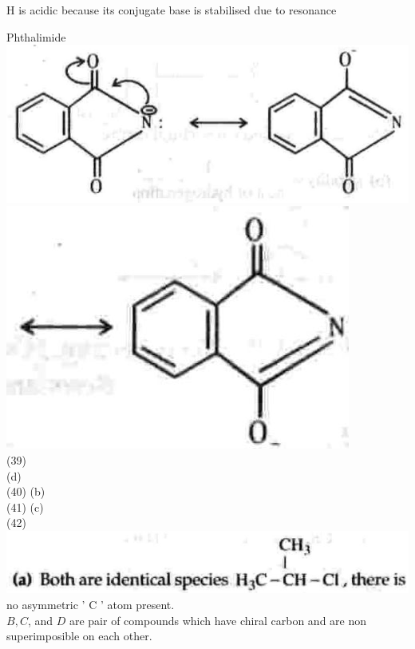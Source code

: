 \documentclass[10pt]{article}
\begin{document}
H is acidic because its conjugate base is stabilised due to resonance

Phthalimide\\
\includegraphics[max width=\textwidth, center]{2025_01_28_8470952b98110cec3aabg-165}\\
\includegraphics[max width=\textwidth, center]{2025_01_28_8470952b98110cec3aabg-165(5)}\\
(39)\\
(d)\\
(40) (b)\\
(41) (c)\\
(42)\\
\includegraphics[max width=\textwidth]{2025_01_28_8470952b98110cec3aabg-165(2)} no asymmetric ' C ' atom present.\\
$B, C$, and $D$ are pair of compounds which have chiral carbon and are non superimposible on each other.\\
\end{document}
